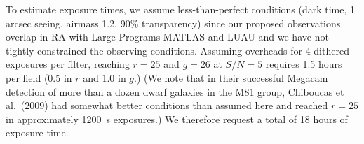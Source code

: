 To estimate exposure times, we assume less-than-perfect conditions (dark time, 1 arcsec seeing, airmass 1.2, 90\% transparency)
since our proposed observations  overlap in RA with Large Programs MATLAS and LUAU and we have not
tightly constrained the observing
conditions. Assuming overheads for 4 dithered exposures per filter, reaching 
$r=25$ and $g=26$ at $S/N=5$ requires 1.5 hours per field (0.5 in $r$ and 1.0 in $g$.)
(We note that in their successful Megacam detection of more than a 
dozen dwarf galaxies in the M81 group, Chiboucas et al.\ (2009) had somewhat
better conditions than assumed here and reached $r=25$ in approximately 1200~s exposures.)
We therefore request a total of 18 hours of exposure time.


